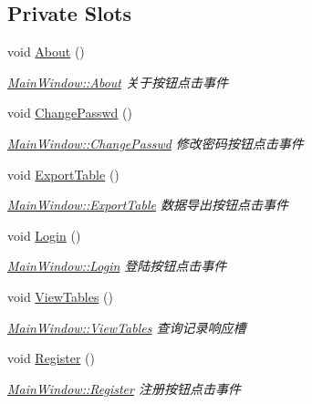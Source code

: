 \subsection*{Private Slots}
\begin{DoxyCompactItemize}
\item 
void \mbox{\hyperlink{class_main_window_acb789dac6a35383ad1d7bb6f652c7cee}{About}} ()
\begin{DoxyCompactList}\small\item\em \mbox{\hyperlink{class_main_window_acb789dac6a35383ad1d7bb6f652c7cee}{Main\+Window\+::\+About}} 关于按钮点击事件 \end{DoxyCompactList}\item 
void \mbox{\hyperlink{class_main_window_a86aa997699ba4fdf4d7b258a412315e5}{Change\+Passwd}} ()
\begin{DoxyCompactList}\small\item\em \mbox{\hyperlink{class_main_window_a86aa997699ba4fdf4d7b258a412315e5}{Main\+Window\+::\+Change\+Passwd}} 修改密码按钮点击事件 \end{DoxyCompactList}\item 
void \mbox{\hyperlink{class_main_window_af225d8bd24ccc47792010109b928f6ba}{Export\+Table}} ()
\begin{DoxyCompactList}\small\item\em \mbox{\hyperlink{class_main_window_af225d8bd24ccc47792010109b928f6ba}{Main\+Window\+::\+Export\+Table}} 数据导出按钮点击事件 \end{DoxyCompactList}\item 
void \mbox{\hyperlink{class_main_window_a27370c71ccd518528509731b5d19e904}{Login}} ()
\begin{DoxyCompactList}\small\item\em \mbox{\hyperlink{class_main_window_a27370c71ccd518528509731b5d19e904}{Main\+Window\+::\+Login}} 登陆按钮点击事件 \end{DoxyCompactList}\item 
void \mbox{\hyperlink{class_main_window_a9a567ed8fe2074af6b1b276972dddfbd}{View\+Tables}} ()
\begin{DoxyCompactList}\small\item\em \mbox{\hyperlink{class_main_window_a9a567ed8fe2074af6b1b276972dddfbd}{Main\+Window\+::\+View\+Tables}} 查询记录响应槽 \end{DoxyCompactList}\item 
void \mbox{\hyperlink{class_main_window_a6228fbb5ed376fb71633b797affc2e11}{Register}} ()
\begin{DoxyCompactList}\small\item\em \mbox{\hyperlink{class_main_window_a6228fbb5ed376fb71633b797affc2e11}{Main\+Window\+::\+Register}} 注册按钮点击事件 \end{DoxyCompactList}\item 

\end{DoxyCompactItemize}
